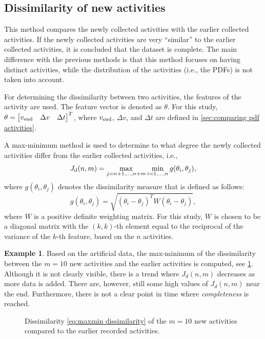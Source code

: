 \documentclass[10pt,final,a4paper,oneside,onecolumn]{article}
\newlength\figurewidth
\newlength\figureheight
\theoremstyle{plain}\newtheorem{definition}{Definition}[section]    %
\theoremstyle{definition}\newtheorem{example}{Example}[section]     %
\theoremstyle{remark}\newtheorem{remarkenv}{Remark}[section]        %
\begin{document}
\subsection{Dissimilarity of new activities}
\label{sec:dissimilarity new activities}

This method compares the newly collected activities with the earlier collected activities. If the newly collected activities are very ``similar'' to the earlier collected activities, it is concluded that the dataset is complete. The main difference with the previous methods is that this method focuses on having distinct activities, while the distribution of the activities (i.e., the PDFs) is not taken into account. 

For determining the dissimilarity between two activities, the features of the activity are used. The feature vector is denoted as $\theta$. For this study, $\theta = \begin{bmatrix} v_{\textup{end}} & \Delta v & \Delta t \end{bmatrix}^T$, where $v_{\textup{end}}$, $\Delta v$, and $\Delta t$ are defined in \cref{sec:comparing pdf activities}.

A max-minimum method is used to determine to what degree the newly collected activities differ from the earlier collected activities, i.e., 
\begin{equation} \label{eq:maxmin dissimilarity}
	J_{\textup{d}}(n, m) = \max_{j=n+1, \ldots, n+m} \min_{i=1, \ldots, n} g(\theta_i, \theta_j),
\end{equation}
where $g(\theta_i, \theta_j)$ denotes the dissimilarity measure that is defined as follows:
\begin{equation}
	g(\theta_i, \theta_j) = \sqrt{ \left( \theta_i - \theta_j \right)^T W \left( \theta_i - \theta_j \right)},
\end{equation}
where $W$ is a positive definite weighting matrix. For this study, $W$ is chosen to be a diagonal matrix with the $(k,k)$-th element equal to the reciprocal of the variance of the $k$-th feature, based on the $n$ activities.

\begin{example}
	Based on the artificial data, the max-minimum of the dissimilarity between the $m=10$ new activities and the earlier activities is computed, see \cref{fig:jd}. Although it is not clearly visible, there is a trend where $J_d(n,m)$ decreases as more data is added. There are, however, still some high values of $J_d(n,m)$ near the end. Furthermore, there is not a clear point in time where \emph{completeness} is reached.
	
	\setlength{}
	\setlength\figureheight{0.7\figurewidth}
	\begin{figure}
		\centering
		\caption{Dissimilarity \cref{eq:maxmin dissimilarity} of the $m=10$ new activities compared to the earlier recorded activities.}
		\label{fig:jd}
	\end{figure}
\end{example}

\printbibliography
\end{document}
